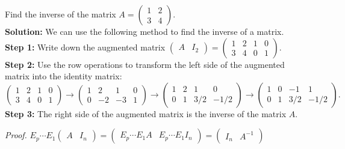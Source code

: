 \documentclass[10pt, a4paper]{article}
\begin{document}
\begin{example}
    Find the inverse of the matrix $A = \begin{pmatrix} 1 & 2 \\ 3 & 4 \end{pmatrix}$.\\
    \textbf{Solution:} We can use the following method to find the inverse of a matrix.\\
    \textbf{Step 1:} Write down the augmented matrix $\begin{pmatrix} A & I_2 \end{pmatrix} = \begin{pmatrix} 1 & 2 & 1 & 0 \\ 3 & 4 & 0 & 1 \end{pmatrix}$.\\
    \textbf{Step 2:} Use the row operations to transform the left side of the augmented matrix into the identity matrix: 
    \(\begin{pmatrix} 1 & 2 & 1 & 0 \\ 3 & 4 & 0 & 1 \end{pmatrix} \rightarrow \begin{pmatrix} 1 & 2 & 1 & 0 \\ 0 & -2 & -3 & 1 \end{pmatrix} \rightarrow \begin{pmatrix} 1 & 2 & 1 & 0 \\ 0 & 1 & 3/2 & -1/2 \end{pmatrix} \rightarrow \begin{pmatrix} 1 & 0 & -1 & 1 \\ 0 & 1 & 3/2 & -1/2 \end{pmatrix}.\)\\
    \textbf{Step 3:} The right side of the augmented matrix is the inverse of the matrix $A$.
\end{example}
\indent \textit{Proof.} $E_p \cdots E_1\begin{pmatrix} A & I_n \end{pmatrix} = \begin{pmatrix}E_p \cdots E_1 A & E_p \cdots E_1 I_n \end{pmatrix} = \begin{pmatrix} I_n & A^{-1} \end{pmatrix}$ 
\end{document}
